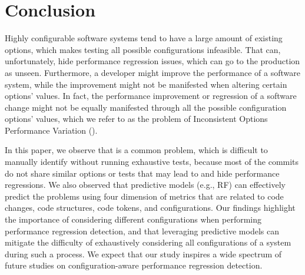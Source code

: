 
\section{Conclusion}
\label{sec:conclusion}

Highly configurable software systems tend to have a large amount of existing options, which makes testing all possible configurations infeasible. That can, unfortunately, hide performance regression issues, which can go to the production as unseen. Furthermore, a developer might improve the performance of a software system, while the improvement might not be manifested when altering certain options' values. In fact, the performance improvement or regression of a software change might not be equally manifested through all the possible configuration options' values, which we refer to as the problem of Inconsistent Options Performance Variation (\inconsistent).

In this paper, %
we observe that \inconsistent is a common problem, which is difficult to manually identify without running exhaustive tests, because most of the commits do not share similar options or tests that may lead to \inconsistent and hide performance regressions.
We also observed that predictive models (e.g., RF) can effectively predict the \inconsistent problems using four dimension of metrics that are related to code changes, code structures, code tokens, and configurations. 
Our findings highlight the importance of considering different configurations when performing performance regression detection, and that leveraging predictive models can mitigate the difficulty of exhaustively considering all configurations of a system during such a process. 
We expect that our study inspires a wide spectrum of future studies on configuration-aware performance regression detection.


